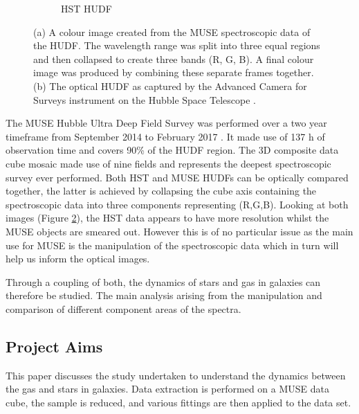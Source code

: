 \documentclass[12pt, twocolumn]{revtex4}    %
\begin{document}
\begin{figure}
\begin{subfigure}[b]{0.4\textwidth}
    \captionsetup{justification=justified}    
    \caption{HST HUDF}
    \label{fig:hubble_ultra_deep_field}
  \end{subfigure}
  \captionsetup{justification=justified}
  \caption[Hubble Ultra Deep Field]{(a) A colour image created from the MUSE spectroscopic data of the HUDF. The wavelength range was split into three equal regions and then collapsed to create three bands (R, G, B). A final colour image was produced by combining these separate frames together. (b) The optical HUDF as captured by the Advanced Camera for Surveys instrument on the Hubble Space Telescope \citep{hudf_image}. }
  \label{fig:hst_muse_hdf}
\end{figure}

The MUSE Hubble Ultra Deep Field Survey was performed over a two year timeframe from September 2014 to February 2017 \citep{bacon_muse_hudf}. It made use of 137 h of observation time and covers 90\% of the HUDF region. The 3D composite data cube mosaic made use of nine fields and represents the deepest spectroscopic survey ever performed. Both HST and MUSE HUDFs can be optically compared together, the latter is achieved by collapsing the cube axis containing the spectroscopic data into three components representing (R,G,B). Looking at both images (Figure \ref{fig:hst_muse_hdf}), the HST data appears to have more resolution whilst the MUSE objects are smeared out. However this is of no particular issue as the main use for MUSE is the manipulation of the spectroscopic data which in turn will help us inform the optical images.




Through a coupling of both, the dynamics of stars and gas in galaxies can therefore be studied. The main analysis arising from the manipulation and comparison of different component areas of the spectra.

\subsection{Project Aims}
This paper discusses the study undertaken to understand the dynamics between the gas and stars in galaxies. Data extraction is performed on a MUSE data cube, the sample is reduced, and various fittings are then applied to the data set. 
\end{document}
